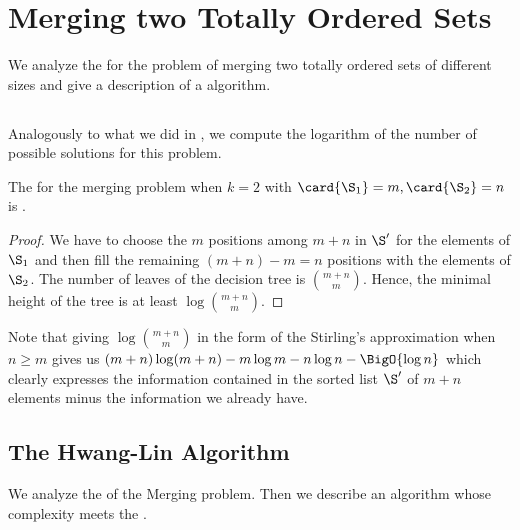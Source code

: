 \section{Merging two Totally Ordered Sets}
\label{tree:merging:k=2}

We analyze the \ITLB for the problem of merging two totally ordered sets of
different sizes and give a description of a \BigO{\ITLB} algorithm.

\subsection{\ITLB}
\label{tree:merging:k=2:ITLB}

Analogously to what we did in , we compute the
logarithm of the number of possible solutions for this problem.
\begin{theorem}
The \ITLB for the merging problem when \(k = 2\) with \(\card{\S_1} = m, \card{\S_2}
= n\) is .
\end{theorem}
\begin{proof}
We have to choose the $m$ positions among $m+n$ in $\S'$ for the elements of
$\S_1$ and then fill the remaining $(m+n) - m = n$ positions with the elements
of $\S_2$. The number of leaves of the decision tree is $\binom{m+n}{m}$.
Hence, the minimal height of the tree is at least $\log \binom{m+n}{m}$.
\end{proof}

Note that giving $\log \binom{m+n}{m}$ in the form of the Stirling's approximation
when \(n \ge m\) gives us $(m+n) \log(m+n) - m \log m - n \log n - \BigO{\log
n}$ which clearly expresses the information contained in the sorted list
$\S'$ of $m+n$ elements minus the information we already have.

\subsection{The Hwang-Lin Algorithm}
\label{tree:merging:k=2:alg}

We analyze the \ITLB of the Merging problem. Then we
describe an algorithm whose complexity meets the \ITLB.

